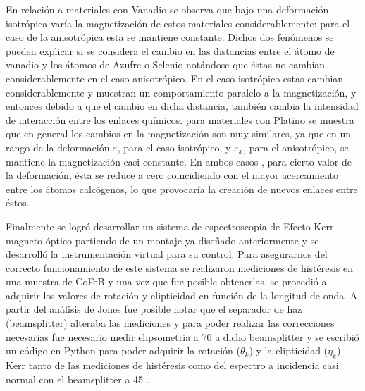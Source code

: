  \newline
 \par En relaci\'on a materiales con Vanadio se observa que bajo una deformaci\'on isotr\'opica var\'ia  la magnetizaci\'on de estos materiales considerablemente: para  el caso de la anisotr\'opica esta se mantiene constante. Dichos  dos fen\'omenos se pueden explicar si se considera el cambio en las distancias entre el \'atomo de vanadio y los \'atomos de Azufre o Selenio notándose   que \'estas no cambian considerablemente  en el caso anisotr\'opico. En el caso isotr\'opico estas  cambian considerablemente y muestran un comportamiento paralelo a la magnetizaci\'on, y entonces debido a que el cambio en dicha distancia, tambi\'en  cambia la intensidad de interacci\'on entre los enlaces qu\'imicos. para materiales con Platino se muestra que en general los cambios en la magnetizaci\'on son muy similares, ya que en un rango de la deformaci\'on $\varepsilon$, para el caso isotr\'opico, y $\varepsilon_x$, para el anisotr\'opico, se mantiene la magnetizaci\'on casi constante.  En ambos casos , para cierto valor de la deformaci\'on, \'esta se reduce a cero coincidiendo con el mayor acercamiento entre los \'atomos calc\'ogenos, lo que provocar\'ia la creaci\'on de nuevos enlaces entre \'estos.
 \newline
 \par Finalmente se logr\'o desarrollar un sistema de espectroscopia de Efecto Kerr magneto-\'optico partiendo de un montaje ya dise\~nado anteriormente y se desarroll\'o la instrumentaci\'on virtual para su control. Para asegurarnos  del correcto funcionamiento de este sistema se realizaron mediciones de hist\'eresis en una muestra de CoFeB y una vez que fue posible obtenerlas, se procedi\'o a adquirir los valores de rotaci\'on y elipticidad en funci\'on de la longitud de onda. A partir  del an\'alisis de Jones fue posible notar que el separador de haz (beamsplitter) alteraba las mediciones y para poder realizar las correcciones necesarias fue necesario medir elipsometr\'ia a 70 \degree a dicho beamsplitter y   se escribi\'o un c\'odigo en Python para poder adquirir la rotaci\'on ($\theta_k$) y la elipticidad ($\eta_k$)  Kerr tanto de las mediciones de hist\'eresis como del espectro a incidencia casi normal con el beamsplitter a 45 \degree.
 \newline
